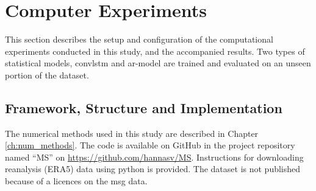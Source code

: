 \section{Computer Experiments} \label{ch:computer_experiments}
This section describes the setup and configuration of the computational experiments conducted in this study, and the accompanied results. Two types of statistical models, \acrshort{convlstm} and \acrshort{ar}-model are trained and evaluated on an unseen portion of the dataset. 

\subsection{Framework, Structure and Implementation} \label{sec:structure_and_implementations} \label{sec:framework}
The numerical methods used in this study are described in Chapter \ref{ch:num_methods}. The code is available on GitHub in the project repository named ``MS'' on \href{https://github.com/hannasv/MS}{https://github.com/hannasv/MS}. Instructions for downloading 
reanalysis (ERA5) data using python is provided. 
The dataset is not published because of a licences on the \acrshort{msg} data. 





